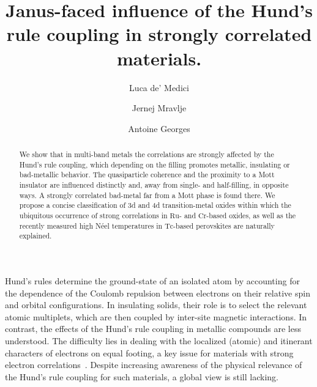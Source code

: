 \documentclass[aps,prl,amsmath, amssymb, english, aps, prl, onecolumn,
  reprint,floatfix, superscriptaddress]{revtex4-1}
\begin{document}
\title{Janus-faced influence of the Hund's rule coupling in strongly correlated materials.}


\author{Luca de' Medici}
\address{Laboratoire de Physique des Solides, UMR8502 CNRS-Universit\'e Paris-Sud, Orsay, France}
\author{Jernej Mravlje}
\address{Centre de Physique Th\'eorique, \'Ecole Polytechnique, CNRS,
  91128 Palaiseau Cedex, France}
\address{Jo\v{z}ef Stefan Institute, Jamova~39, SI-1000, Ljubljana, Slovenia}
\author{Antoine Georges}
\address{Centre de Physique Th\'eorique, \'Ecole Polytechnique, CNRS, 91128 Palaiseau Cedex, France}
\address{Coll\`ege de France, 11 place Marcelin Berthelot, 75005 Paris, France}
\address{Japan Science and Technology Agency, CREST, Kawaguchi
  332-0012, Japan}


\begin{abstract}
We show that in multi-band metals the correlations are strongly
affected by the Hund's rule coupling, which depending on the filling
promotes metallic, insulating or bad-metallic behavior. The
quasiparticle coherence and the proximity to a Mott insulator are
influenced distinctly and, away from single- and half-filling, in
opposite ways. A strongly correlated bad-metal far from a Mott phase
is found there.
We propose a concise classification of 3d and 4d                                                         
transition-metal oxides within which the ubiquitous                                                    
occurrence of strong correlations in $\mbox{Ru}$- and                                                                    
$\mbox{Cr}$-based oxides, as well as the recently measured high N\'eel                                                         
temperatures in $\mbox{Tc}$-based perovskites are naturally explained.
\end{abstract}


\maketitle


 
 Hund's rules determine the ground-state of an isolated atom by
 accounting for the dependence of the Coulomb repulsion between
 electrons on their relative spin and orbital configurations.  In
 insulating solids, their role is to select the relevant atomic
 multiplets, which are then coupled by inter-site magnetic
 interactions.  In contrast, the effects of the Hund's rule coupling in
 metallic compounds are less understood.  The difficulty lies in
 dealing with the localized (atomic) and itinerant characters of
 electrons on equal footing, a key issue for materials with strong
 electron correlations~\cite{imada_mit_review}.  Despite increasing
 awareness of the physical relevance of the Hund's rule coupling for such
 materials\cite{haule09,werner08,werner09,mazin_Hund_pnictides,aichhorn10,mravlje11,demedici_MottHund},
 a global view is still lacking. 
\end{document}
